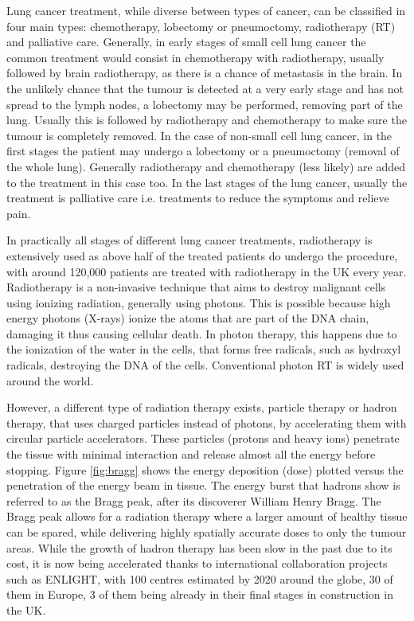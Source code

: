 Lung cancer treatment, while diverse between types of cancer, can be classified in four main types: chemotherapy, lobectomy or pneumoctomy, radiotherapy (RT) and palliative care. Generally, in early stages of small cell lung cancer the common treatment would consist in chemotherapy with radiotherapy, usually followed by brain radiotherapy, as there is a chance of metastasis in the brain. In the unlikely chance that the tumour is detected at a very early stage and has not spread to the lymph nodes, a lobectomy may be performed, removing part of the lung. Usually this is followed by radiotherapy and chemotherapy to make sure the tumour is completely removed.
In the case of non-small cell lung cancer, in the first stages the patient may undergo a lobectomy or a pneumoctomy (removal of the whole lung). Generally radiotherapy and chemotherapy (less likely) are added to the treatment in this case too. In the last stages of the lung cancer, usually the treatment is palliative care i.e. treatments to reduce the symptoms and relieve pain\cite{CRUK2014b}.

In practically all stages of different lung cancer treatments, radiotherapy is extensively used as above half of the treated patients do undergo the procedure\cite{Cancerorg}, with around 120,000 patients are treated with radiotherapy in the UK every year. Radiotherapy is a non-invasive technique that aims to destroy malignant cells using ionizing radiation, generally using photons. This is possible because high energy photons (X-rays) ionize the atoms that are part of the DNA chain, damaging it thus causing cellular death. In photon therapy, this happens due to the ionization of the water in the cells, that forms free radicals, such as hydroxyl radicals, destroying the DNA of the cells. Conventional photon RT is widely used around the world.

However, a different type of radiation therapy exists, particle therapy or hadron therapy, that uses charged particles instead of photons, by accelerating them with circular particle accelerators. These particles (protons and heavy ions)  penetrate the tissue with minimal interaction and release almost all the energy before stopping. Figure \ref{fig:bragg} shows the energy deposition (dose) plotted versus the penetration of the energy beam in tissue. The energy burst that hadrons show is referred to as the Bragg peak, after its discoverer William Henry Bragg. The Bragg peak allows for a radiation therapy where a larger amount of healthy tissue can be spared, while delivering highly spatially accurate doses to only the tumour areas. While the growth of hadron therapy has been slow in the past due to its cost, it is now being accelerated thanks to international collaboration projects such as ENLIGHT\cite{dosanjhparticle}, with 100 centres estimated by 2020 around the globe, 30 of them in Europe, 3 of them being already in their final stages in construction in the UK.

